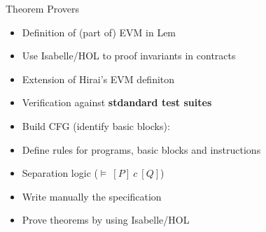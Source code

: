 \begin{frame}{Theorem Provers}
    \begin{block}{\cite{hirai2017defining}}
        \begin{itemize}
            \item Definition of (part of) EVM in Lem
            \item Use Isabelle/HOL to proof invariants in 
            contracts
        \end{itemize}
    \end{block}
    \begin{block}{\cite{towardsVerifyingEthereumSmartContract}}
        \begin{itemize}
            \item Extension of Hirai's EVM definiton
            \item Verification against \textbf{stdandard test suites}
            \item Build CFG (identify basic blocks):
            \item Define rules for programs, basic blocks and instructions  
            \item Separation logic ($\vDash\ [P]\ c\ [Q]$)
            \item Write manually the specification
            \item Prove theorems by using Isabelle/HOL
        \end{itemize}
    \end{block}

\end{frame}
